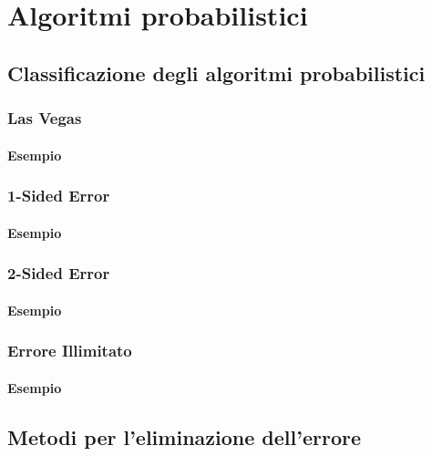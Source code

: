 \documentclass[\main/main.tex]{subfiles}
\begin{document}
\chapter{Algoritmi probabilistici}
\section{Classificazione degli algoritmi probabilistici}
\subsection{Las Vegas}
\subsubsection{Esempio}
\subsection{1-Sided Error}
\subsubsection{Esempio}
\subsection{2-Sided Error}
\subsubsection{Esempio}
\subsection{Errore Illimitato}
\subsubsection{Esempio}

\section{Metodi per l'eliminazione dell'errore}
\end{document}
